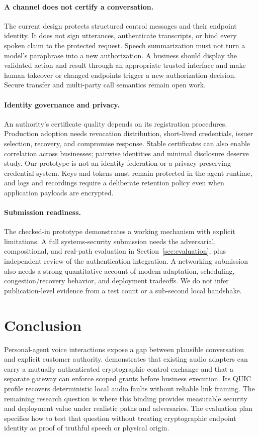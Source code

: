 \paragraph{A channel does not certify a conversation.}
The current design protects structured control messages and their endpoint
identity. It does not sign utterances, authenticate transcripts, or bind every
spoken claim to the protected request. Speech summarization must not turn a
model's paraphrase into a new authorization. A business should display the
validated action and result through an appropriate trusted interface and
make human takeover or changed endpoints trigger a new authorization decision.
Secure transfer and multi-party call semantics remain open work.

\paragraph{Identity governance and privacy.}
An authority's certificate quality depends on its registration procedures.
Production adoption needs revocation distribution, short-lived credentials,
issuer selection, recovery, and compromise response. Stable certificates can
also enable correlation across businesses; pairwise identities and minimal
disclosure deserve study. Our prototype is not an identity federation or a
privacy-preserving credential system. Keys and tokens must remain protected
in the agent runtime, and logs and recordings require a deliberate retention
policy even when application payloads are encrypted.

\paragraph{Submission readiness.}
The checked-in prototype demonstrates a working mechanism with explicit
limitations. A full systems-security submission needs the adversarial,
compositional, and real-path evaluation in Section~\ref{sec:evaluation}, plus
independent review of the authentication integration. A networking submission
also needs a strong quantitative account of modem adaptation, scheduling,
congestion/recovery behavior, and deployment tradeoffs. We do not infer
publication-level evidence from a test count or a sub-second local handshake.

\section{Conclusion}
\label{sec:conclusion}
Personal-agent voice interactions expose a gap between plausible conversation
and explicit customer authority. \sys{} demonstrates that existing audio
adapters can carry a mutually authenticated cryptographic control exchange and
that a separate gateway can enforce scoped grants before business execution.
Its QUIC profile recovers deterministic local audio faults without reliable
link framing. The remaining research question is where this binding provides
measurable security and deployment value under realistic paths and adversaries.
The evaluation plan specifies how to test that question without treating
cryptographic endpoint identity as proof of truthful speech or physical origin.
